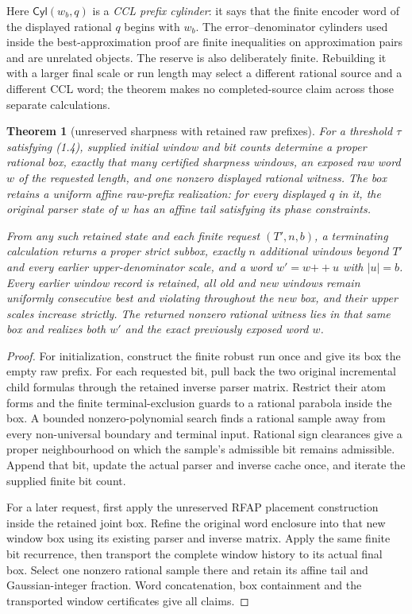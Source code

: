 \documentclass[10pt]{article}
\newtheorem{theorem}{Theorem}[section]
\theoremstyle{definition}
\theoremstyle{remark}
\newcommand{\Cyl}{\mathsf{Cyl}}
\begin{document}
Here $\Cyl(w_b,q)$ is a \emph{CCL prefix cylinder}: it says that the finite
encoder word of the displayed rational $q$ begins with $w_b$.  The
error--denominator cylinders used inside the best-approximation proof are
finite inequalities on approximation pairs and are unrelated objects.  The
reserve is also deliberately finite.  Rebuilding it with a larger final
scale or run length may select a different rational source and a different
CCL word; the theorem makes no completed-source claim across those separate
calculations.

\begin{theorem}[unreserved sharpness with retained raw prefixes]
\label{thm:ccl-unreserved-sharpness}
For a threshold $\tau$ satisfying (1.4), supplied initial window and bit
counts determine a proper rational box, exactly that many certified
sharpness windows, an exposed raw word $w$ of the requested length, and
one nonzero displayed rational witness. The box retains a uniform affine
raw-prefix realization: for every displayed $q$ in it, the original parser
state of $w$ has an affine tail satisfying its phase constraints.

From any such retained state and each finite request $(T',n,b)$, a
terminating calculation returns a proper strict subbox, exactly $n$
additional windows beyond $T'$ and every earlier upper-denominator scale,
and a word $w'=w\mathbin{+\!\!+}u$ with $|u|=b$. Every earlier window
record is retained, all old and new windows remain uniformly consecutive
best and violating throughout the new box, and their upper scales increase
strictly. The returned nonzero rational witness lies in that same box and
realizes both $w'$ and the exact previously exposed word $w$.
\end{theorem}

\begin{proof}
For initialization, construct the finite robust run once and give its box
the empty raw prefix. For each requested bit, pull back the two original
incremental child formulas through the retained inverse parser matrix.
Restrict their atom forms and the finite terminal-exclusion guards to a
rational parabola inside the box. A bounded nonzero-polynomial search
finds a rational sample away from every non-universal boundary and
terminal input. Rational sign clearances give a proper neighbourhood on
which the sample's admissible bit remains admissible. Append that bit,
update the actual parser and inverse cache once, and iterate the supplied
finite bit count.

For a later request, first apply the unreserved RFAP placement construction
inside the retained joint box. Refine the original word enclosure into
that new window box using its existing parser and inverse matrix. Apply
the same finite bit recurrence, then transport the complete window history
to its actual final box. Select one nonzero rational sample there and
retain its affine tail and Gaussian-integer fraction. Word concatenation,
box containment and the transported window certificates give all claims.
\end{proof}
\end{document}
